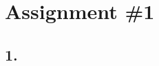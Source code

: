 \documentclass[12pt]{article}
\begin{document}
\section*{Assignment \#1}

\subsection*{1.}
\end{document}
